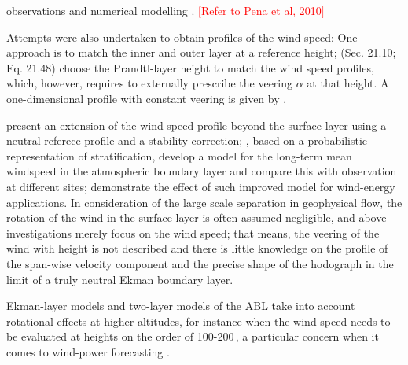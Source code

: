 \documentclass[a4paper,11pt]{amsart}
\newcommand{\todo}[1]{\textcolor{red}{$[$#1$]$}}
\begin{document}
observations \citep{hogstrom:BM1988,hogstrom:BM1996}
and numerical modelling \citep{spalart:PF2008, spalart:PF2009, ansorge:BM2014, ansorge:BM2019}.
\todo{Refer to Pena et al, 2010} 
%
\par
%
Attempts were also undertaken to obtain profiles of the wind speed: 
One approach is to match the inner and outer layer at a reference height;
\citet{etling:2002, emeis:2018}  (Sec. 21.10; Eq. 21.48) choose the Prandtl-layer height to match
the wind speed profiles, which, however, requires to externally prescribe the veering $\alpha$ at that height. 
A one-dimensional profile with constant veering is given by \citet[Sec. 3; Eq. 3.1-3.19]{emeis:m2007}. 

\citet{gryning:BM2007} present an extension of the wind-speed profile beyond the surface layer
using a neutral referece profile and a stability correction;
\cite{kelly:BM2010}, based on a probabilistic representation of stratification,
develop a model for the long-term mean windspeed
in the atmospheric boundary layer and compare this with observation at different sites; 
\cite{kelly:WE2016} demonstrate the effect of such improved model for wind-energy applications.
%
In consideration of the large scale separation in geophysical flow, the rotation of the wind in the
surface layer is often assumed negligible, and above investigations merely focus on the wind speed; 
that means, the veering of the wind with height is not described and there is little knowledge on the
profile of the span-wise velocity component and the precise shape of the hodograph in the limit of a
truly neutral Ekman boundary layer.
%
%
\par %
%
Ekman-layer models and two-layer models of the ABL take into account rotational effects at higher altitudes,
for instance when the wind speed needs to be evaluated at heights on the order of 100-200\,,
a particular concern when it comes to wind-power forecasting \citep{optis:BM2014}.
\end{document}

